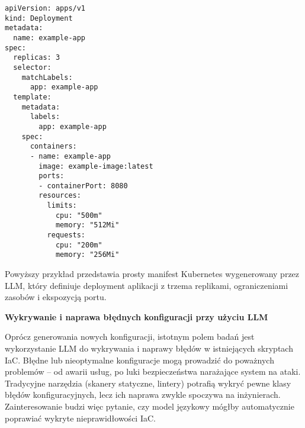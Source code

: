 \begin{lstlisting}
apiVersion: apps/v1
kind: Deployment
metadata:
  name: example-app
spec:
  replicas: 3
  selector:
    matchLabels:
      app: example-app
  template:
    metadata:
      labels:
        app: example-app
    spec:
      containers:
      - name: example-app
        image: example-image:latest
        ports:
        - containerPort: 8080
        resources:
          limits:
            cpu: "500m"
            memory: "512Mi"
          requests:
            cpu: "200m"
            memory: "256Mi"
\end{lstlisting}

Powyższy przykład przedstawia prosty manifest Kubernetes wygenerowany przez LLM, który definiuje deployment aplikacji z trzema replikami, ograniczeniami zasobów i ekspozycją portu.

\textbf{Wykrywanie i naprawa błędnych konfiguracji przy użyciu LLM}

Oprócz generowania nowych konfiguracji, istotnym polem badań jest wykorzystanie LLM do wykrywania i naprawy błędów w istniejących skryptach IaC. Błędne lub nieoptymalne konfiguracje mogą prowadzić do poważnych problemów – od awarii usług, po luki bezpieczeństwa narażające system na ataki. Tradycyjne narzędzia (skanery statyczne, lintery) potrafią wykryć pewne klasy błędów konfiguracyjnych, lecz ich naprawa zwykle spoczywa na inżynierach. Zainteresowanie budzi więc pytanie, czy model językowy mógłby automatycznie poprawiać wykryte nieprawidłowości IaC.

